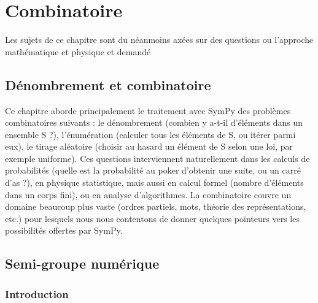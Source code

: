 \part{Combinatoire}

Les sujets de ce chapitre sont du néanmoins axées sur des questions ou l'approche mathématique et 
physique et demandé 

\chapter{Dénombrement et combinatoire}
Ce chapitre aborde principalement le traitement avec SymPy des problèmes
combinatoires suivants : le dénombrement (combien y a-t-il d’éléments dans un
ensemble S ?), l’énumération (calculer tous les éléments de S, ou itérer parmi
eux), le tirage aléatoire (choisir au hasard un élément de S selon une loi, par
exemple uniforme). Ces questions interviennent naturellement dans les calculs de
probabilités (quelle est la probabilité au poker d’obtenir une suite, ou un carré
d’as ?), en physique statistique, mais aussi en calcul formel (nombre d’éléments
dans un corps fini), ou en analyse d’algorithmes. La combinatoire couvre un
domaine beaucoup plus vaste (ordres partiels, mots, théorie des représentations,
etc.) pour lesquels nous nous contentons de donner quelques pointeurs vers les
possibilités offertes par SymPy.
\chapter{Semi-groupe numérique}
\section{Introduction}

 
